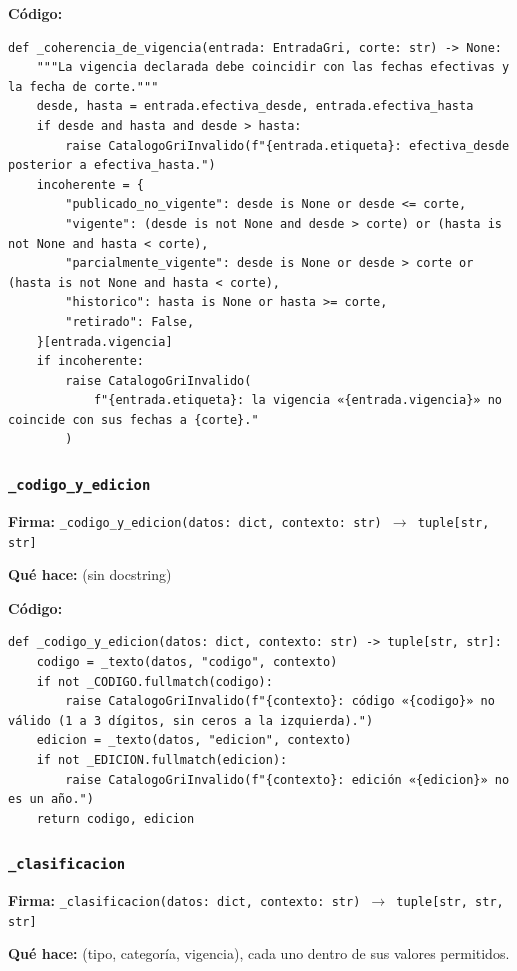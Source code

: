 \documentclass[11pt,a4paper]{article}
\begin{document}
\textbf{Código:}
\begin{lstlisting}
def _coherencia_de_vigencia(entrada: EntradaGri, corte: str) -> None:
    """La vigencia declarada debe coincidir con las fechas efectivas y la fecha de corte."""
    desde, hasta = entrada.efectiva_desde, entrada.efectiva_hasta
    if desde and hasta and desde > hasta:
        raise CatalogoGriInvalido(f"{entrada.etiqueta}: efectiva_desde posterior a efectiva_hasta.")
    incoherente = {
        "publicado_no_vigente": desde is None or desde <= corte,
        "vigente": (desde is not None and desde > corte) or (hasta is not None and hasta < corte),
        "parcialmente_vigente": desde is None or desde > corte or (hasta is not None and hasta < corte),
        "historico": hasta is None or hasta >= corte,
        "retirado": False,
    }[entrada.vigencia]
    if incoherente:
        raise CatalogoGriInvalido(
            f"{entrada.etiqueta}: la vigencia «{entrada.vigencia}» no coincide con sus fechas a {corte}."
        )
\end{lstlisting}

\subsubsection*{\texttt{\_codigo\_y\_edicion}}
\textbf{Firma:} \texttt{\_codigo\_y\_edicion(datos: dict, contexto: str) $\rightarrow$ tuple[str, str]}

\textbf{Qué hace:} (sin docstring)

\textbf{Código:}
\begin{lstlisting}
def _codigo_y_edicion(datos: dict, contexto: str) -> tuple[str, str]:
    codigo = _texto(datos, "codigo", contexto)
    if not _CODIGO.fullmatch(codigo):
        raise CatalogoGriInvalido(f"{contexto}: código «{codigo}» no válido (1 a 3 dígitos, sin ceros a la izquierda).")
    edicion = _texto(datos, "edicion", contexto)
    if not _EDICION.fullmatch(edicion):
        raise CatalogoGriInvalido(f"{contexto}: edición «{edicion}» no es un año.")
    return codigo, edicion
\end{lstlisting}

\subsubsection*{\texttt{\_clasificacion}}
\textbf{Firma:} \texttt{\_clasificacion(datos: dict, contexto: str) $\rightarrow$ tuple[str, str, str]}

\textbf{Qué hace:} (tipo, categoría, vigencia), cada uno dentro de sus valores permitidos.
\end{document}
